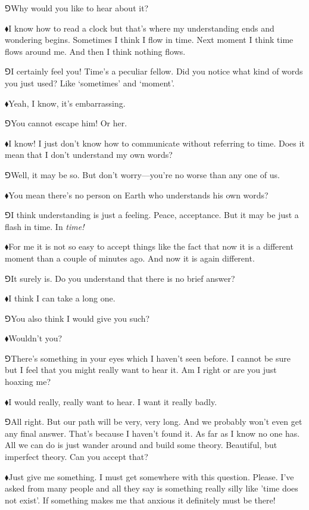 \documentclass[10pt,oneside%
]{memoir}
\newcommand{\hea}{\(\blacklozenge\)\;}
\newcommand{\heb}{\(\Game\)\;}
\begin{document}
\heb Why would you like to hear about it?

\hea I know how to read a clock but that's where my understanding ends and wondering begins. Sometimes I think I flow in time. Next moment I think time flows around me. And then I think nothing flows.

\heb I certainly feel you! Time's a peculiar fellow. Did you notice what kind of words you just used? Like `sometimes' and `moment'.

\hea Yeah, I know, it's embarrassing.

\heb You cannot escape him! Or her.

\hea I know! I just don't know how to communicate without referring to time. Does it mean that I don't understand my own words?

\heb Well, it may be so. But don't worry---you're no worse than any one of us.

\hea You mean there's no person on Earth who understands his own words?

\heb I think understanding is just a feeling. Peace, acceptance. But it may be just a flash in time. In \emph{time!}

\hea For me it is not so easy to accept things like the fact that now it is a different moment than a couple of minutes ago. And now it is again different.

\heb It surely is. Do you understand that there is no brief answer?

\hea I think I can take a long one.

\heb You also think I would give you such?

\hea Wouldn't you?

\heb There's something in your eyes which I haven't seen before. I cannot be sure but I feel that you might really want to hear it. Am I right or are you just hoaxing me?

\hea I would really, really want to hear. I want it really badly.

\heb All right. But our path will be very, very long. And we probably won't even get any final answer. That's because I haven't found it. As far as I know no one has. All we can do is just wander around and build some theory. Beautiful, but imperfect theory. Can you accept that?

\hea Just give me something. I must get somewhere with this question. Please. I've asked from many people and all they say is something really silly like 'time does not exist'. If something makes me that anxious it definitely must be there!
\end{document}
